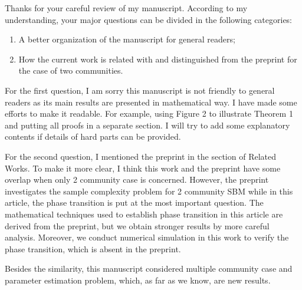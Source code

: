 \documentclass{article}
\begin{document}
	\pagestyle{empty}
	Thanks for your careful review of my manuscript. According to my understanding, your major
	questions can be divided in the following categories:
	\begin{enumerate}
		\item A better organization of the manuscript for general readers;
		\item How the current work is related with and distinguished from the preprint for the case of two
		communities.
	\end{enumerate}
	
	For the first question, I am sorry this manuscript is not friendly to general readers as its main results
	are presented in mathematical way. I have made some efforts to make it readable. For example, using
	Figure 2 to illustrate Theorem 1 and putting all proofs in a separate section. I will try to add some
	explanatory contents if details of hard parts can be provided.
	
	For the second question, I mentioned the preprint in the section of Related Works. To make it more clear,
	I think this work and the preprint have some overlap when only 2 community case is concerned.
	However, the preprint investigates the sample complexity problem for 2 community SBM while in this article,
	the phase transition is put at the most important question.
	The mathematical techniques used to establish phase transition in this article are derived from the preprint, but we obtain stronger
	results by more careful analysis.
	Moreover, we conduct numerical simulation in this work to verify the phase transition, which is absent in the preprint.
	
	Besides the similarity, this manuscript considered multiple community case and parameter estimation problem, which, as far as we know, 
	are new results.
\end{document}

